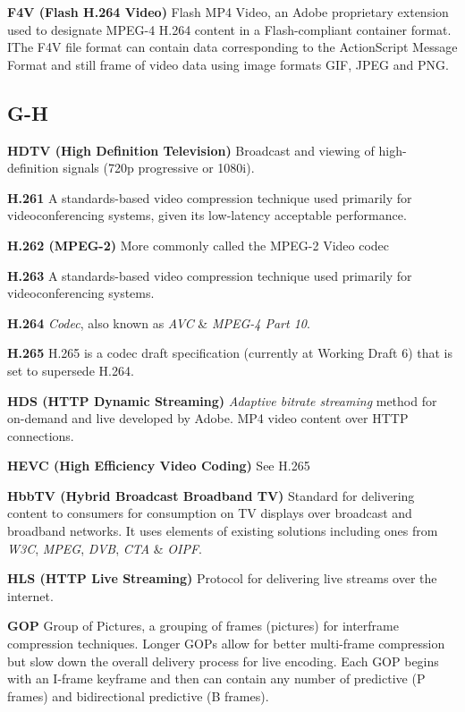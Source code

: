 \smallskip
\textbf{F4V (Flash H.264 Video)}
Flash MP4 Video, an Adobe proprietary extension used to designate MPEG-4 H.264 content in a Flash-compliant container format. IThe F4V file format can contain data corresponding to the ActionScript Message Format and still frame of video data using image formats GIF, JPEG and PNG.

\subsection{G-H}

\smallskip
\textbf{HDTV (High Definition Television)}
Broadcast and viewing of high-definition signals (720p progressive or 1080i).

\smallskip
\textbf{H.261}
A standards-based video compression technique used primarily for videoconferencing systems, given its low-latency acceptable performance.

\smallskip
\textbf{H.262 (MPEG-2)}
More commonly called the MPEG-2 Video codec

\smallskip
\textbf{H.263}
A standards-based video compression technique used primarily for videoconferencing systems.

\smallskip
\textbf{H.264}
\textit{Codec}, also known as \textit{AVC} \&  \textit{MPEG-4 Part 10}.

\smallskip
\textbf{H.265}
H.265 is a codec draft specification (currently at Working Draft 6) that is set to supersede H.264.


\smallskip
\textbf{HDS (HTTP Dynamic Streaming)}
\textit{Adaptive bitrate streaming} method for on-demand and live developed by Adobe. MP4 video content over HTTP connections.

\smallskip
\textbf{HEVC (High Efficiency Video Coding)}
See H.265

\smallskip
\textbf{HbbTV (Hybrid Broadcast Broadband TV)}
Standard for delivering content to consumers for consumption on TV displays over broadcast and broadband networks. It uses elements of existing solutions including ones from \textit{W3C}, \textit{MPEG}, \textit{DVB}, \textit{CTA} \& \textit{OIPF}.

\smallskip
\textbf{HLS (HTTP Live Streaming)}
Protocol for delivering live streams over the internet.

\smallskip
\textbf{GOP}
Group of Pictures, a grouping of frames (pictures) for interframe compression techniques. Longer GOPs allow for better multi-frame compression but slow down the overall delivery process for live encoding. Each GOP begins with an I-frame keyframe and then can contain any number of predictive (P frames) and bidirectional predictive (B frames).


